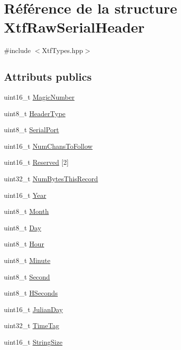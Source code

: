 \hypertarget{structXtfRawSerialHeader}{}\section{Référence de la structure Xtf\+Raw\+Serial\+Header}
\label{structXtfRawSerialHeader}


{\ttfamily \#include $<$Xtf\+Types.\+hpp$>$}

\subsection*{Attributs publics}
\begin{DoxyCompactItemize}
\item 
uint16\+\_\+t \hyperlink{structXtfRawSerialHeader_a3efa0d09b365dfc5556c472a8383ea9c}{Magic\+Number}
\item 
uint8\+\_\+t \hyperlink{structXtfRawSerialHeader_ae902ea00629f413f53499f6543a69cca}{Header\+Type}
\item 
uint8\+\_\+t \hyperlink{structXtfRawSerialHeader_ab81661fe1a2927ef1d7862f772b7bac3}{Serial\+Port}
\item 
uint16\+\_\+t \hyperlink{structXtfRawSerialHeader_a5c21db420edacca2be7f28a2128a9d81}{Num\+Chans\+To\+Follow}
\item 
uint16\+\_\+t \hyperlink{structXtfRawSerialHeader_ab8d2c85daa659b3d23a9a5510def1d1b}{Reserved} \mbox{[}2\mbox{]}
\item 
uint32\+\_\+t \hyperlink{structXtfRawSerialHeader_a4b47f1a824568949f8fd2131aafda75b}{Num\+Bytes\+This\+Record}
\item 
uint16\+\_\+t \hyperlink{structXtfRawSerialHeader_a6661e5aae84d324e92fba442ecd38d0f}{Year}
\item 
uint8\+\_\+t \hyperlink{structXtfRawSerialHeader_a5fe5a5e49445fea7a6e8a887fdd580f0}{Month}
\item 
uint8\+\_\+t \hyperlink{structXtfRawSerialHeader_aa2204118443db3d1d71512a1f8706468}{Day}
\item 
uint8\+\_\+t \hyperlink{structXtfRawSerialHeader_ad2f807c2f1748da05b6908bda20d0e7a}{Hour}
\item 
uint8\+\_\+t \hyperlink{structXtfRawSerialHeader_afb827a43ca76f72e36ba4590ec7a792c}{Minute}
\item 
uint8\+\_\+t \hyperlink{structXtfRawSerialHeader_a803207d947a29bd5f6c55868a09d3452}{Second}
\item 
uint8\+\_\+t \hyperlink{structXtfRawSerialHeader_ae5fce89432bd55cd99ba87e41ba9e0f9}{H\+Seconds}
\item 
uint16\+\_\+t \hyperlink{structXtfRawSerialHeader_a36e41457a045d58601989da202d1eead}{Julian\+Day}
\item 
uint32\+\_\+t \hyperlink{structXtfRawSerialHeader_abd69b2e3871dfc90cae404d6c66b6349}{Time\+Tag}
\item 
uint16\+\_\+t \hyperlink{structXtfRawSerialHeader_a8095fa1513cab9eb856f7fcc24a415ad}{String\+Size}
\end{DoxyCompactItemize}


